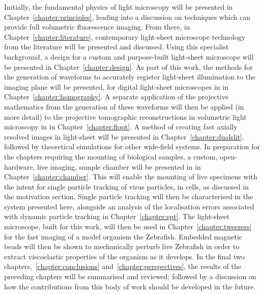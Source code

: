 Initially, the fundamental physics of light microscopy will be presented in Chapter~\ref{chapter:principles}, leading into a discussion on techniques which can provide full volumetric fluorescence imaging.
From there, in Chapter~\ref{chapter:literature}, contemporary light-sheet microscope technology from the literature will be presented and discussed.
Using this specialist background, a design for a custom and purpose-built light-sheet microscope will be presented in Chapter~\ref{chapter:design}.
As part of this work, the methods for the generation of waveforms to accurately register light-sheet illumination to the imaging plane will be presented, for digital light-sheet microscopes in in Chapter~\ref{chapter:homography}.
A separate application of the projective mathematics from the generation of these waveforms will then be applied (in more detail) to the projective tomographic reconstructions in volumetric light microscopy in in Chapter~\ref{chapter:flopt}.
A method of creating fast axially resolved images in light-sheet will be presented in Chapter~\ref{chapter:dualslit}, followed by theoretical simulations for other wide-field systems.
In preparation for the chapters requiring the mounting of biological samples, a custom, open-hardware, live imaging, sample chamber will be presented in in Chapter~\ref{chapter:chamber}.
This will enable the mounting of live specimens with the intent for single particle tracking of virus particles, in cells, as discussed in the motivation section.
Single particle tracking will then be characterised in the system presented here, alongside an analysis of the localisation errors associated with dynamic particle tracking in Chapter~\ref{chapter:spt}.
The light-sheet microscope, built for this work, will then be used in Chapter~\ref{chapter:tweezers} for the fast imaging of a model organism the Zebrafish.
Embedded magnetic beads will then be shown to mechanically perturb live Zebrafish in order to extract viscoelastic properties of the organism as it develops.
In the final two chapters,~\ref{chapter:conclusions} and~\ref{chapter:perspectives}, the results of the preceding chapters will be summarised and reviewed; followed by a discussion on how the contributions from this body of work should be developed in the future.
